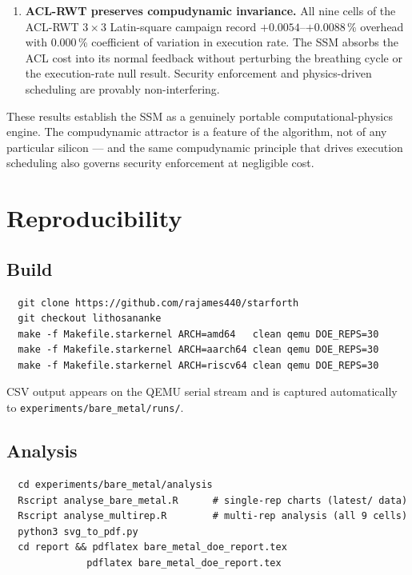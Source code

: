 \documentclass[10pt,a4paper]{article}
\begin{document}
\begin{enumerate}[noitemsep]
  \item \textbf{ACL-RWT preserves compudynamic invariance.}
    All nine cells of the ACL-RWT $3\times3$ Latin-square campaign record
    $+0.0054$--$+0.0088$\,\% overhead with 0.000\,\% coefficient of variation
    in execution rate.  The SSM absorbs the ACL cost into its normal feedback
    without perturbing the breathing cycle or the execution-rate null result.
    Security enforcement and physics-driven scheduling are provably
    non-interfering.
\end{enumerate}

These results establish the SSM as a genuinely portable computational-physics
engine.  The compudynamic attractor is a feature of the algorithm, not of any
particular silicon --- and the same compudynamic principle that drives
execution scheduling also governs security enforcement at negligible cost.

\appendix
\section{Reproducibility}
\label{app:repro}

\subsection{Build}

\begin{verbatim}
  git clone https://github.com/rajames440/starforth
  git checkout lithosananke
  make -f Makefile.starkernel ARCH=amd64   clean qemu DOE_REPS=30
  make -f Makefile.starkernel ARCH=aarch64 clean qemu DOE_REPS=30
  make -f Makefile.starkernel ARCH=riscv64 clean qemu DOE_REPS=30
\end{verbatim}

CSV output appears on the QEMU serial stream and is captured automatically
to \texttt{experiments/bare\_metal/runs/}.

\subsection{Analysis}

\begin{verbatim}
  cd experiments/bare_metal/analysis
  Rscript analyse_bare_metal.R      # single-rep charts (latest/ data)
  Rscript analyse_multirep.R        # multi-rep analysis (all 9 cells)
  python3 svg_to_pdf.py
  cd report && pdflatex bare_metal_doe_report.tex
              pdflatex bare_metal_doe_report.tex
\end{verbatim}
\end{document}
